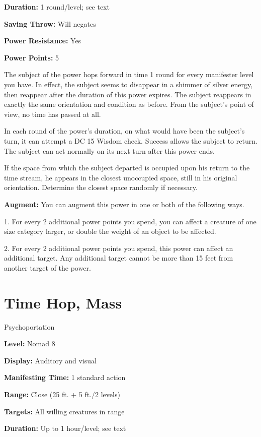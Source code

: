 \documentclass{article}
\begin{document}
\textbf{Duration:} 1 round/level; see text

\textbf{Saving Throw:} Will negates

\textbf{Power Resistance:} Yes

\textbf{Power Points:} 5

The subject of the power hops forward in time 1 round for every manifester level 
you have. In effect, the subject seems to disappear in a shimmer of silver energy, 
then reappear after the duration of this power expires. The subject reappears in 
exactly the same orientation and condition as before. From the subject's point 
of view, no time has passed at all.

In each round of the power's duration, on what would have been the subject's turn, 
it can attempt a DC 15 Wisdom check. Success allows the subject to return. The 
subject can act normally on its next turn after this power ends.

If the space from which the subject departed is occupied upon his return to the 
time stream, he appears in the closest unoccupied space, still in his original 
orientation. Determine the closest space randomly if necessary.

\textbf{Augment:} You can augment this power in one or both of the following ways.

1. For every 2 additional power points you spend, you can affect a creature of 
one size category larger, or double the weight of an object to be affected.

2. For every 2 additional power points you spend, this power can affect an additional 
target. Any additional target cannot be more than 15 feet from another target of 
the power.

\vspace{12pt}
\section*{Time Hop, Mass}

Psychoportation

\textbf{Level:} Nomad 8

\textbf{Display:} Auditory and visual

\textbf{Manifesting Time:} 1 standard action

\textbf{Range:} Close (25 ft. + 5 ft./2 levels)

\textbf{Targets:} All willing creatures in range

\textbf{Duration:} Up to 1 hour/level; see text
\end{document}
